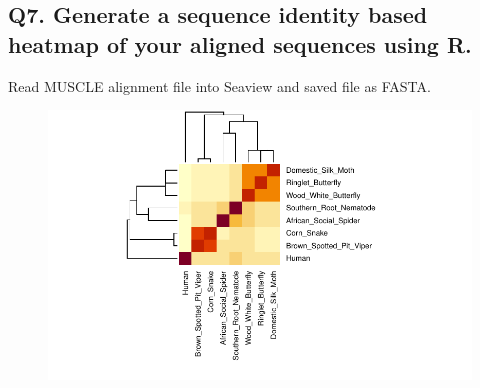 \documentclass[
  letterpaper,
  DIV=11,
  numbers=noendperiod]{scrartcl}
\begin{document}
\hypertarget{q7.-generate-a-sequence-identity-based-heatmap-of-your-aligned-sequences-using-r.}{%
\subsection{\texorpdfstring{Q7. \textbf{Generate a sequence identity
based heatmap of your aligned sequences using
R.}}{Q7. Generate a sequence identity based heatmap of your aligned sequences using R.}}\label{q7.-generate-a-sequence-identity-based-heatmap-of-your-aligned-sequences-using-r.}}

Read MUSCLE alignment file into Seaview and saved file as FASTA.

\begin{figure}

{\centering \includegraphics{findagene_files/figure-pdf/unnamed-chunk-4-1.pdf}

}

\end{figure}
\end{document}
